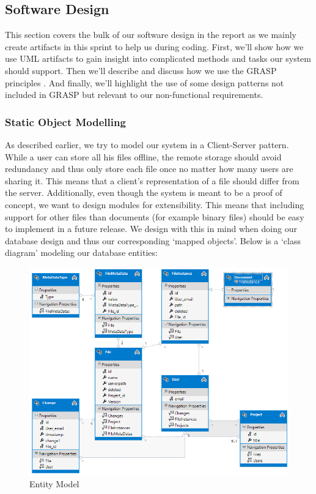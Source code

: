 \subsection{Software Design}
This section covers the bulk of our software design in the report as we mainly create artifacts in this sprint to help us during coding. First, we'll show how we use UML artifacts to gain insight into complicated methods and tasks our system should support. Then we'll describe and discuss how we use the GRASP principles \cite[p.~271, p.~413]{OOAD}. And finally, we'll highlight the use of some design patterns not included in GRASP but relevant to our non-functional requirements.
\subsubsection{Static Object Modelling}
As described earlier, we try to model our system in a Client-Server pattern. While a user can store all his files offline, the remote storage should avoid redundancy and thus only store each file once no matter how many users are sharing it. This means that a client's representation of a file should differ from the server. Additionally, even though the system is meant to be a proof of concept, we want to design modules for extensibility. This means that including support for other files than documents (for example binary files) should be easy to implement in a future release. We design with this in mind when doing our database design and thus our corresponding ‘mapped objects'. Below is a ‘class diagram' modeling our database entities:\\
\begin{figure}[h]
  \includegraphics[width=\textwidth,natwidth=793,natheight=635]{illustrations/entitymodel.png}
  \caption{Entity Model}
  \label{entitymodel2}
\end{figure}
